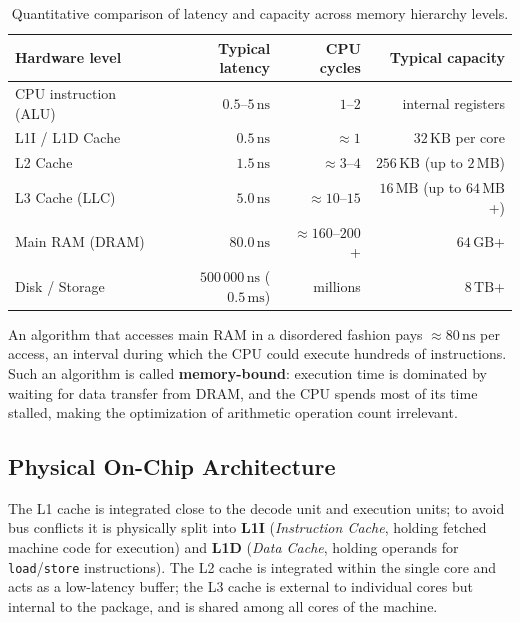 \begin{table}[htbp]
\centering
\small
\begin{tabular}{l r r r}
\toprule
\textbf{Hardware level} & \textbf{Typical latency} & \textbf{CPU cycles} & \textbf{Typical capacity} \\
\midrule
CPU instruction (ALU) & $0.5$--$5\,\text{ns}$ & $1$--$2$ & internal registers \\
L1I / L1D Cache & $0.5\,\text{ns}$ & $\approx 1$ & $32\,\text{KB}$ per core \\
L2 Cache & $1.5\,\text{ns}$ & $\approx 3$--$4$ & $256\,\text{KB}$ (up to $2\,\text{MB}$) \\
L3 Cache (LLC) & $5.0\,\text{ns}$ & $\approx 10$--$15$ & $16\,\text{MB}$ (up to $64\,\text{MB}$+) \\
Main RAM (DRAM) & $80.0\,\text{ns}$ & $\approx 160$--$200$+ & $64\,\text{GB}$+ \\
Disk / Storage & $500\,000\,\text{ns}$ ($0.5\,\text{ms}$) & millions & $8\,\text{TB}$+ \\
\bottomrule
\end{tabular}
\caption{Quantitative comparison of latency and capacity across memory hierarchy levels.}
\label{tab:gerarchia-memoria-en}
\end{table}

\begin{definition}
An algorithm that accesses main RAM in a disordered fashion pays $\approx 80\,\text{ns}$ per access, an interval during which the CPU could execute hundreds of instructions. Such an algorithm is called \textbf{memory-bound}: execution time is dominated by waiting for data transfer from DRAM, and the CPU spends most of its time stalled, making the optimization of arithmetic operation count irrelevant.
\end{definition}

\subsection{Physical On-Chip Architecture}

The L1 cache is integrated close to the decode unit and execution units; to avoid bus conflicts it is physically split into \textbf{L1I} (\textit{Instruction Cache}, holding fetched machine code for execution) and \textbf{L1D} (\textit{Data Cache}, holding operands for \texttt{load}/\texttt{store} instructions). The L2 cache is integrated within the single core and acts as a low-latency buffer; the L3 cache is external to individual cores but internal to the package, and is shared among all cores of the machine.


